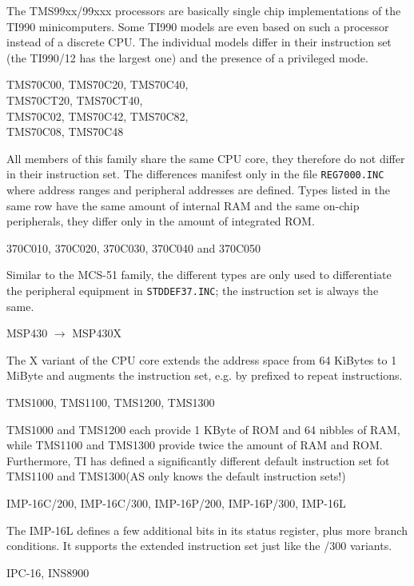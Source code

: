 \documentclass[12pt,twoside]{report}
\newcommand{\tty}[1]{{\tt #1}}
\newcommand{\asname}{{AS}}
\begin{document}
The TMS99xx/99xxx processors are basically single chip implementations
of the TI990 minicomputers.  Some TI990 models are even based on such
a processor instead of a discrete CPU.  The individual models differ in their
instruction set (the TI990/12 has the largest one) and the presence of a
privileged mode.
\begin{cpulist}
   TMS70C00, TMS70C20, TMS70C40,\\
\> TMS70CT20, TMS70CT40,\\
\> TMS70C02, TMS70C42, TMS70C82,\\
\> TMS70C08, TMS70C48
\end{cpulist}
All members of this family share the same CPU core, they therefore do not
differ in their instruction set.  The differences manifest only in the
file \tty{REG7000.INC} where address ranges and peripheral addresses are
defined.  Types listed in the same row have the same amount of internal
RAM and the same on-chip peripherals, they differ only in the amount of
integrated ROM.
\begin{cpulist}
  370C010, 370C020, 370C030, 370C040 and 370C050
\end{cpulist}
Similar to the MCS-51 family, the different types are only used to
differentiate the peripheral equipment in \tty{STDDEF37.INC}; the
instruction set is always the same.
\begin{cpulist}
   MSP430 $\rightarrow$ MSP430X
\end{cpulist}
The X variant of the CPU core extends the address space from 64
KiBytes to 1 MiByte and augments the instruction set, e.g. by
prefixed to repeat instructions.
\begin{cpulist}
   TMS1000, TMS1100, TMS1200, TMS1300
\end{cpulist}
TMS1000 and TMS1200 each provide 1 KByte of ROM and 64 nibbles of
RAM, while TMS1100 and TMS1300 provide twice the amount of RAM
and ROM.  Furthermore, TI has defined a significantly different
default instruction set fot TMS1100 and TMS1300(\asname{} only knows the
default instruction sets!)
\begin{cpulist}
   IMP-16C/200, IMP-16C/300, IMP-16P/200, IMP-16P/300, IMP-16L
\end{cpulist}
The IMP-16L defines a few additional bits in its status register,
plus more branch conditions.  It supports the extended instruction
set just like the /300 variants.
\begin{cpulist}
   IPC-16, INS8900
\end{cpulist}
\end{document}
